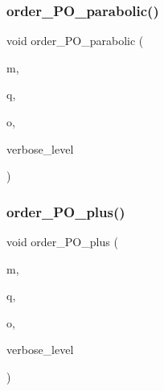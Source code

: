\mbox{\label{_l_i_b_2_g_a_l_o_i_s_2orthogonal__points_8_c_ab3f777ac181e26bb1d335b81541e28d7}} 
\subsubsection{\texorpdfstring{order\+\_\+\+P\+O\+\_\+parabolic()}{order\_PO\_parabolic()}}
{\footnotesize\ttfamily void order\+\_\+\+P\+O\+\_\+parabolic (\begin{DoxyParamCaption}\item[{\mbox{\hyperlink{galois_8h_a09fddde158a3a20bd2dcadb609de11dc}{I\+NT}}}]{m,  }\item[{\mbox{\hyperlink{galois_8h_a09fddde158a3a20bd2dcadb609de11dc}{I\+NT}}}]{q,  }\item[{\mbox{\hyperlink{classlonginteger__object}{longinteger\+\_\+object}} \&}]{o,  }\item[{\mbox{\hyperlink{galois_8h_a09fddde158a3a20bd2dcadb609de11dc}{I\+NT}}}]{verbose\+\_\+level }\end{DoxyParamCaption})}

\mbox{\label{_l_i_b_2_g_a_l_o_i_s_2orthogonal__points_8_c_a7b502d4e1c2313cc7ba4c78db024f99a}} 
\subsubsection{\texorpdfstring{order\+\_\+\+P\+O\+\_\+plus()}{order\_PO\_plus()}}
{\footnotesize\ttfamily void order\+\_\+\+P\+O\+\_\+plus (\begin{DoxyParamCaption}\item[{\mbox{\hyperlink{galois_8h_a09fddde158a3a20bd2dcadb609de11dc}{I\+NT}}}]{m,  }\item[{\mbox{\hyperlink{galois_8h_a09fddde158a3a20bd2dcadb609de11dc}{I\+NT}}}]{q,  }\item[{\mbox{\hyperlink{classlonginteger__object}{longinteger\+\_\+object}} \&}]{o,  }\item[{\mbox{\hyperlink{galois_8h_a09fddde158a3a20bd2dcadb609de11dc}{I\+NT}}}]{verbose\+\_\+level }\end{DoxyParamCaption})}

